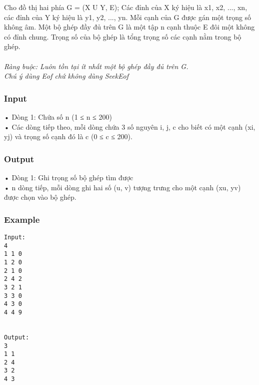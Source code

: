 



   Cho đồ thị hai phía G = (X U Y, E); Các đỉnh của X ký hiệu là x1, x2, ..., xn, các đỉnh của Y ký hiệu là y1, y2, ..., yn. Mỗi cạnh của G được gán một trọng số không âm. Một bộ ghép đầy đủ trên G là một tập n cạnh thuộc E đôi một không có đỉnh chung. Trọng số của  bộ ghép là tổng trọng số các cạnh nằm trong bộ ghép.   
\\
\\\textit{    Ràng buộc: Luôn tồn tại ít nhất một bộ ghép đầy đủ trên G.   }
\\\textit{    Chú ý dùng         Eof        chứ không dùng         SeekEof       }

\subsubsection{   Input  }

   • Dòng 1: Chứa số n (1 ≤ n ≤ 200)   
\\   • Các dòng tiếp theo, mỗi dòng chứa 3 số nguyên i, j, c cho biết có một cạnh (xi, yj) và trọng số cạnh đó là c (0 ≤ c ≤ 200).  

\subsubsection{   Output  }

   • Dòng 1: Ghi trọng số bộ ghép tìm được   
\\   • n dòng tiếp, mỗi dòng ghi hai số (u, v) tượng trưng cho một cạnh (xu, yv) được chọn vào bộ ghép.  

\subsubsection{   Example  }
\begin{verbatim}
Input:
4
1 1 0
1 2 0
2 1 0
2 4 2
3 2 1
3 3 0
4 3 0
4 4 9


Output:
3
1 1
2 4
3 2
4 3

\end{verbatim}